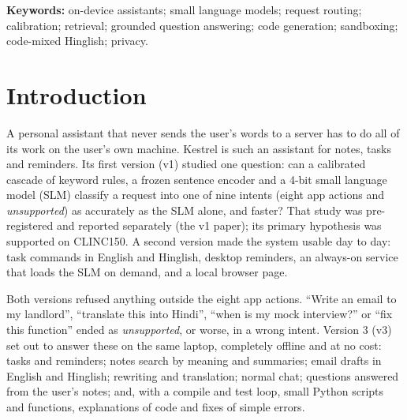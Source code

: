 \documentclass[11pt,a4paper]{article}
\begin{document}
\noindent\textbf{Keywords:} on-device assistants; small language models; request routing; calibration; retrieval;
grounded question answering; code generation; sandboxing; code-mixed Hinglish; privacy.

\section{Introduction}\label{sec:intro}

A personal assistant that never sends the user's words to a server has to do all of its work on the user's own
machine. Kestrel is such an assistant for notes, tasks and reminders. Its first version (v1) studied one question: can
a calibrated cascade of keyword rules, a frozen sentence encoder and a 4-bit small language model (SLM) classify a
request into one of nine intents (eight app actions and \emph{unsupported}) as accurately as the SLM alone, and
faster? That study was pre-registered and
reported separately (the v1 paper); its primary hypothesis was supported on CLINC150. A second version made the
system usable day to day: task commands in English and Hinglish, desktop reminders, an always-on service that loads the
SLM on demand, and a local browser page.

Both versions refused anything outside the eight app actions. ``Write an email to my landlord'', ``translate this into
Hindi'', ``when is my mock interview?'' or ``fix this function'' ended as \emph{unsupported}, or worse, in a wrong
intent. Version 3 (v3) set out to answer these on the same laptop, completely offline and at no cost: tasks and
reminders; notes search by meaning and summaries; email drafts in English and Hinglish; rewriting and translation;
normal chat; questions answered from the user's notes; and, with a compile and test loop, small Python scripts and
functions, explanations of code and fixes of simple errors.
\end{document}
